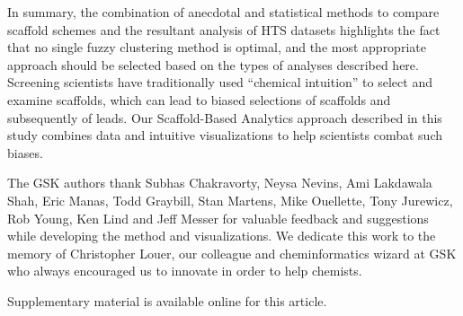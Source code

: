 \documentclass[journal=jacsat,manuscript=article]{achemso}
\begin{document}
In summary, the combination of anecdotal and statistical methods to
compare scaffold schemes and the resultant analysis of HTS datasets
highlights the fact that no single fuzzy clustering method is optimal,
and the most appropriate approach should be selected based on the
types of analyses described here. Screening scientists have traditionally
used ``chemical intuition'' to select and examine scaffolds, which can 
lead to biased selections of scaffolds and subsequently of
leads. Our Scaffold-Based Analytics approach described in this study
combines data and intuitive visualizations to help scientists combat such biases. 


\begin{acknowledgement}
  The GSK authors thank Subhas Chakravorty, Neysa Nevins, Ami Lakdawala Shah,
  Eric Manas, Todd Graybill, Stan Martens, Mike Ouellette, Tony Jurewicz, Rob
  Young, Ken Lind and Jeff Messer for valuable feedback and suggestions while developing the method and visualizations. We dedicate this work to the memory of Christopher Louer, our colleague and cheminformatics wizard at GSK who always encouraged us to innovate in order to help chemists.  
\end{acknowledgement}

\begin{suppinfo}
Supplementary material is available online for this article.
\end{suppinfo}


\end{document}
